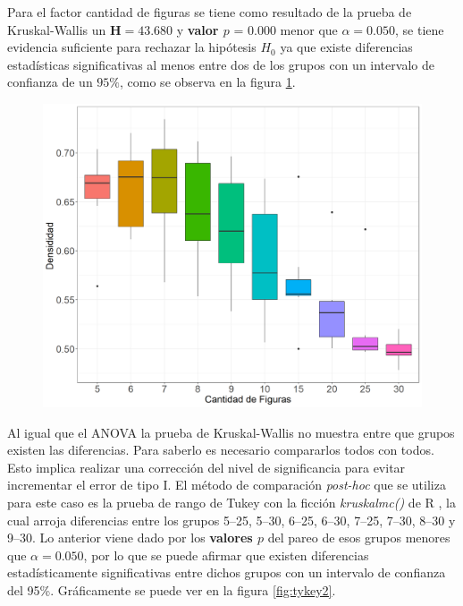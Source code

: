 \documentclass[5p,times]{elsarticle}
\begin{document}
Para el factor cantidad de figuras se tiene como resultado de la prueba de Kruskal-Wallis un $\textbf{H} = 43.680$ y \textbf{valor $p$} = 0.000 menor que $\alpha = 0.050$, se tiene evidencia suficiente para rechazar la hipótesis $H_{0}$ ya que existe diferencias estadísticas significativas al menos entre dos de los grupos con un intervalo de confianza de un $95\%$, como se observa en la figura \ref{fig:boxplotc2}. 
	\begin{figure}
				\begin{center}
					\includegraphics[scale=0.35]{figuras/Ceboxplotcant.png}
					\label{fig:boxplotc2}
				\end{center}
			\end{figure}
			
Al igual que el ANOVA la prueba de Kruskal-Wallis no muestra entre que grupos existen las diferencias. Para saberlo es necesario compararlos todos con todos. Esto implica realizar una corrección del nivel de significancia para evitar incrementar el error de tipo I. El método de comparación \textit{post-hoc} que se utiliza para este caso es la prueba de rango de Tukey con la ficción \textit{kruskalmc()} de R \cite{R},  la cual arroja diferencias entre los grupos 5--25, 5--30, 6--25, 6--30, 7--25, 7--30, 8--30 y 9--30. Lo anterior viene dado por los \textbf{valores $p$} del pareo de esos grupos menores que $\alpha = 0.050$, por lo que se puede afirmar que existen diferencias estadísticamente significativas entre dichos grupos con un intervalo de confianza del 95\%. Gráficamente se puede ver en la figura \ref{fig:tykey2}.
\end{document}
